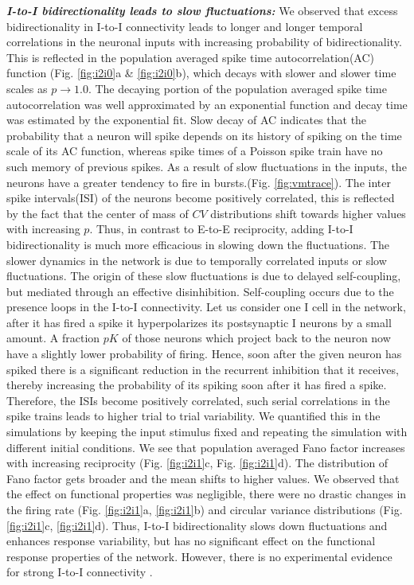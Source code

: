 \emph{\textbf{I-to-I bidirectionality leads to slow fluctuations:}} We observed that excess bidirectionality in I-to-I connectivity leads to longer and longer temporal correlations in the neuronal inputs with increasing probability of bidirectionality. This is reflected in the population averaged spike time autocorrelation(AC) function (Fig. \ref{fig:i2i0}a \& \ref{fig:i2i0}b), which decays with slower and slower time scales as $p \rightarrow 1.0$. The decaying portion of the population averaged spike time autocorrelation was well approximated by an exponential function and decay time was estimated by the exponential fit. Slow decay of AC indicates that the probability that a neuron will spike depends on its history of spiking on the time scale of its AC function, whereas spike times of a Poisson spike train have no such memory of previous spikes. As a result of slow fluctuations in the inputs, the neurons have a greater tendency to fire in bursts.(Fig. \ref{fig:vmtrace}). The inter spike intervals(ISI) of the neurons become positively correlated, this is reflected by the fact that the center of mass of $CV$ distributions shift towards higher values with increasing $p$. Thus, in contrast to E-to-E reciprocity, adding I-to-I bidirectionality is much more efficacious in slowing down the fluctuations. The slower dynamics in the network is due to temporally correlated inputs or slow fluctuations. The origin of these slow fluctuations is due to delayed self-coupling, but mediated through an effective disinhibition. Self-coupling occurs due to the presence loops in the I-to-I connectivity. Let us consider one I cell in the network, after it has fired a spike it hyperpolarizes its postsynaptic I neurons by a small amount. A fraction $pK$ of those neurons which project back to the neuron now have a slightly lower probability of firing. Hence, soon after the given neuron has spiked there is a significant reduction in the recurrent inhibition that it receives, thereby increasing the probability of its spiking soon after it has fired a spike. Therefore, the ISIs become positively correlated, such serial correlations in the spike trains leads to higher trial to trial variability. We quantified this in the simulations by keeping the input stimulus fixed and repeating the simulation with different initial conditions. We see that population averaged Fano factor increases with increasing reciprocity (Fig. \ref{fig:i2i1}c, Fig. \ref{fig:i2i1}d). The distribution of Fano factor  gets broader and the mean shifts to higher values. We observed that the effect on functional properties was negligible, there were no drastic changes in the firing rate (Fig. \ref{fig:i2i1}a, \ref{fig:i2i1}b) and circular variance distributions (Fig. \ref{fig:i2i1}c, \ref{fig:i2i1}d). Thus, I-to-I bidirectionality slows down fluctuations and enhances response variability, but has no significant effect on the functional response properties of the network. However, there is no experimental evidence for strong I-to-I connectivity \cite{Avermann2012}.\\

